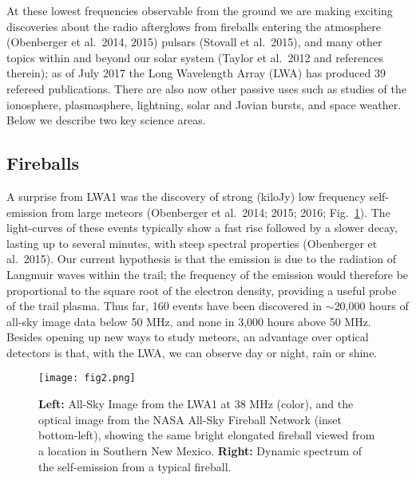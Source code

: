 \documentclass[11pt]{article}
\begin{document}
At these lowest frequencies observable from the ground
we are making exciting discoveries
about the radio afterglows from fireballs entering the
atmosphere (Obenberger et al.\ 2014, 2015) pulsars (Stovall et
al.\ 2015), and many other topics within and beyond our solar system
(Taylor et al.\ 2012 and references therein); as of July 2017 the Long
Wavelength Array (LWA) has produced 39 refereed
publications. There
are also now other passive uses such as studies of the ionosphere, plasmasphere, lightning, solar and Jovian bursts, and space weather. Below we
describe two key science areas.

\vspace{-0.5cm}
\subsection{Fireballs}
\vspace{-0.25cm}

A surprise from LWA1 was the discovery of strong (kiloJy)
low frequency self-emission from large meteors (Obenberger et al.\ 2014; 
2015; 2016; 
Fig.~\ref{fireball}).
The light-curves of these events
typically show a fast rise followed by a slower decay, lasting up to
several minutes, with steep spectral properties (Obenberger et al.\ 2015). 
Our current hypothesis is
that the emission is due to the radiation of Langmuir waves within
the trail; the frequency of the emission would therefore be
proportional to the square root of the electron density, providing a
useful probe of the trail plasma. Thus far, 160 events have been
discovered in $\sim$20,000 hours of all-sky image data below 50 MHz, and
none in 3,000 hours above 50 MHz. Besides opening up new ways to 
study meteors, an advantage over optical detectors is that, with the LWA, 
we can observe day or night, rain or shine.  

\begin{figure}[ht!]
\begin{center}
\texttt{[image: fig2.png]}
\end{center}
\vspace{-0.5cm}
  \caption{
{\bf Left:} All-Sky Image from the LWA1 at 38 MHz (color), and the optical image from the NASA All-Sky Fireball Network (inset bottom-left), showing the same bright elongated fireball viewed from a location in Southern New Mexico. {\bf Right:} Dynamic spectrum of the self-emission from a typical fireball.
}
\label{fireball}
\end{figure}
\end{document}
